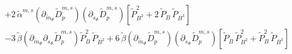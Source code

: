 \begin{align}
      \nonumber \\
                       & + 2\,\tilde \alpha^{m,s} \left( \partial_{\breve m_{\Phi}} \tilde D_p^{m,s} \right)\left( \partial_{\breve s_{\Phi}} \tilde D_p^{m,s} \right)
                         \left[ \tilde P_{B^2}^2 + 2\, \tilde P_B\, \tilde P_{B^3} \right]
      \nonumber \\
                       & - 3\, \tilde \beta \left( \partial_{\breve m_{\Phi}}\partial_{\breve s_{\Phi}} \tilde D_p^{m,s} \right) \tilde P_B^2\,  \tilde P_{B^2}
                         + 6\, \tilde \beta \left( \partial_{\breve m_{\Phi}} \tilde D_p^{m,s} \right)\left( \partial_{\breve s_{\Phi}} \tilde D_p^{m,s} \right)
                         \left[ \tilde P_B\,  \tilde P_{B^2}^2 + \tilde P_B^2\,  \tilde P_{B^3} \right]
\end{align}

